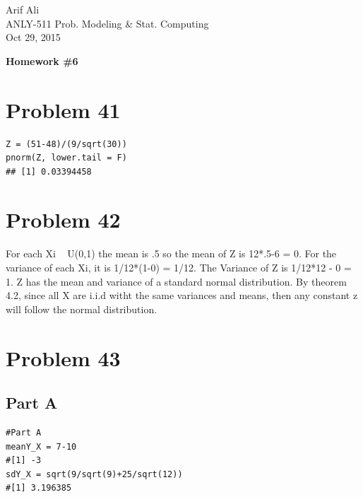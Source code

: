 \documentclass{article}\usepackage[]{graphicx}\usepackage[]{color}
\makeatletter
\newenvironment{kframe}{%
 \def\at@end@of@kframe{}%
 \ifinner\ifhmode%
  \def\at@end@of@kframe{\end{minipage}}%
  \begin{minipage}{\columnwidth}%
 \fi\fi%
 \def\FrameCommand##1{\hskip\@totalleftmargin \hskip-\fboxsep
 \colorbox{shadecolor}{##1}\hskip-\fboxsep
     \hskip-\linewidth \hskip-\@totalleftmargin \hskip\columnwidth}%
 \MakeFramed {\advance\hsize-\width
   \@totalleftmargin\z@ \linewidth\hsize
   \@setminipage}}%
 {\par\unskip\endMakeFramed%
 \at@end@of@kframe}
\newenvironment{knitrout}{}{} %
\makeatother
\begin{document}
\begin{flushright}
  Arif Ali\\
  ANLY-511 Prob. Modeling \& Stat. Computing\\
	Oct 29, 2015\\
\end{flushright}

\begin{center}
  \LARGE\textbf{Homework \#6}
\end{center}

\section*{Problem 41}
\begin{knitrout}
\color{fgcolor}\begin{kframe}
\begin{verbatim}
Z = (51-48)/(9/sqrt(30))
pnorm(Z, lower.tail = F)
## [1] 0.03394458
\end{verbatim}
\end{kframe}
\end{knitrout}
\section*{Problem 42}
For each Xi ~ U(0,1) the mean is .5 so the mean of Z is 12*.5-6 = 0. For the variance of each Xi, it is 1/12*(1-0) = 1/12. The Variance of Z is 1/12*12 - 0 = 1. Z has the mean and variance of a standard normal distribution. By theorem 4.2, since all X are i.i.d witht the same variances and means, then any constant z will follow the normal distribution.
\section*{Problem 43}
\subsection*{Part A}
\begin{knitrout}
\color{fgcolor}\begin{kframe}
\begin{verbatim}
#Part A
meanY_X = 7-10
#[1] -3
sdY_X = sqrt(9/sqrt(9)+25/sqrt(12))
#[1] 3.196385
\end{verbatim}
\end{kframe}
\end{knitrout}
\end{document}

